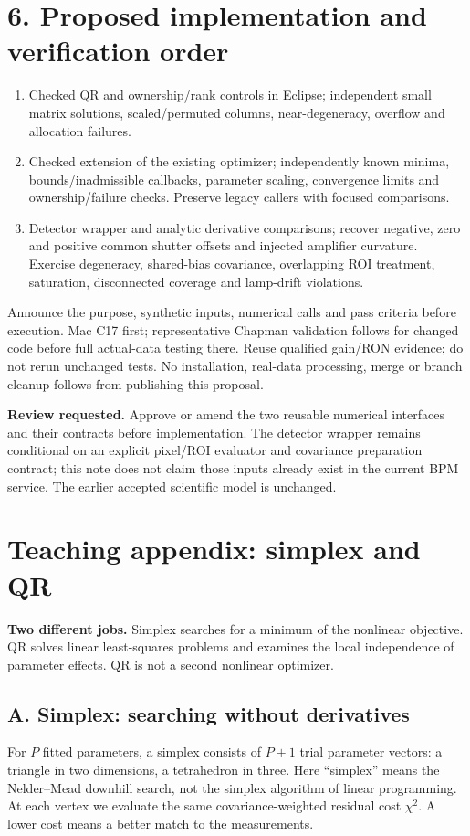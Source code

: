 \documentclass[11pt,a4paper]{article}
\begin{document}
\section*{6. Proposed implementation and verification order}
\begin{enumerate}
\item Checked QR and ownership/rank controls in Eclipse; independent small
matrix solutions, scaled/permuted columns, near-degeneracy, overflow and
allocation failures.
\item Checked extension of the existing optimizer; independently known minima,
bounds/inadmissible callbacks, parameter scaling, convergence limits and
ownership/failure checks. Preserve legacy callers with focused comparisons.
\item Detector wrapper and analytic derivative comparisons; recover negative,
zero and positive common shutter offsets and injected amplifier curvature.
Exercise degeneracy, shared-bias covariance, overlapping ROI treatment,
saturation, disconnected coverage and lamp-drift violations.
\end{enumerate}
Announce the purpose, synthetic inputs, numerical calls and pass criteria before
execution. Mac C17 first; representative Chapman validation follows for changed
code before full actual-data testing there. Reuse qualified gain/RON evidence;
do not rerun unchanged tests. No installation, real-data processing, merge or
branch cleanup follows from publishing this proposal.

\textbf{Review requested.} Approve or amend the two reusable numerical interfaces
and their contracts before implementation. The detector wrapper remains
conditional on an explicit pixel/ROI evaluator and covariance preparation
contract; this note does not claim those inputs already exist in the current BPM
service. The earlier accepted scientific model is unchanged.
\clearpage
\appendix
\section*{Teaching appendix: simplex and QR}
\textbf{Two different jobs.} Simplex searches for a minimum of the nonlinear
objective. QR solves linear least-squares problems and examines the local
independence of parameter effects. QR is not a second nonlinear optimizer.

\subsection*{A. Simplex: searching without derivatives}
For $P$ fitted parameters, a simplex consists of $P+1$ trial parameter vectors:
a triangle in two dimensions, a tetrahedron in three. Here ``simplex'' means
the Nelder--Mead downhill search, not the simplex algorithm of linear programming.
At each vertex we evaluate the same covariance-weighted residual cost
$\chi^2$. A lower cost means a better match to the measurements.
\end{document}
